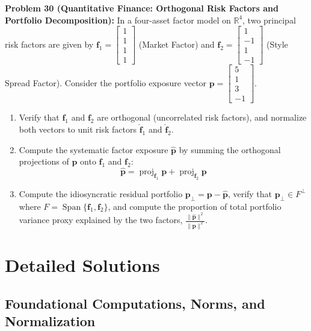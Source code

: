 \documentclass[11pt, letterpaper]{article}
\theoremstyle{definition}
\theoremstyle{remark}
\begin{document}
\textbf{Problem 30 (Quantitative Finance: Orthogonal Risk Factors and Portfolio Decomposition):} In a four-asset factor model on $\mathbb{R}^4$, two principal risk factors are given by $\mathbf{f}_1 = \begin{bmatrix} 1 \\ 1 \\ 1 \\ 1 \end{bmatrix}$ (Market Factor) and $\mathbf{f}_2 = \begin{bmatrix} 1 \\ -1 \\ 1 \\ -1 \end{bmatrix}$ (Style Spread Factor). Consider the portfolio exposure vector $\mathbf{p} = \begin{bmatrix} 5 \\ 1 \\ 3 \\ -1 \end{bmatrix}$.
\begin{enumerate}[label=(\alph*)]
    \item Verify that $\mathbf{f}_1$ and $\mathbf{f}_2$ are orthogonal (uncorrelated risk factors), and normalize both vectors to unit risk factors $\hat{\mathbf{f}}_1$ and $\hat{\mathbf{f}}_2$.
    \item Compute the systematic factor exposure $\hat{\mathbf{p}}$ by summing the orthogonal projections of $\mathbf{p}$ onto $\mathbf{f}_1$ and $\mathbf{f}_2$:
    \[
    \hat{\mathbf{p}} = \operatorname{proj}_{\mathbf{f}_1}\mathbf{p} + \operatorname{proj}_{\mathbf{f}_2}\mathbf{p}
    \]
    \item Compute the idiosyncratic residual portfolio $\mathbf{p}_{\perp} = \mathbf{p} - \hat{\mathbf{p}}$, verify that $\mathbf{p}_{\perp} \in F^{\perp}$ where $F = \operatorname{Span}\{\mathbf{f}_1, \mathbf{f}_2\}$, and compute the proportion of total portfolio variance proxy explained by the two factors, $\frac{\|\hat{\mathbf{p}}\|^2}{\|\mathbf{p}\|^2}$.
\end{enumerate}

\newpage
\section{Detailed Solutions}

\subsection{Foundational Computations, Norms, and Normalization}
\end{document}
